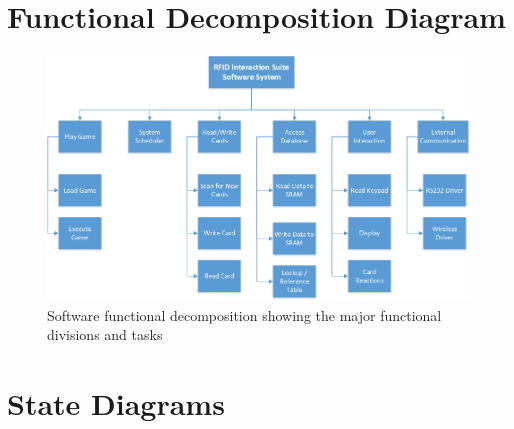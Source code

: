 \documentclass[12pt]{article} %
\begin{document}
\section{Functional Decomposition Diagram\label{fig:funcDecomp}}

\begin{figure}[H]
	\centering
	\includegraphics[width=\textwidth]{images/funDecomp.png}
	\caption{Software functional decomposition showing the major functional divisions and tasks}
	\label{fig:funDecomp}
\end{figure}

\section{State Diagrams}
\end{document}

